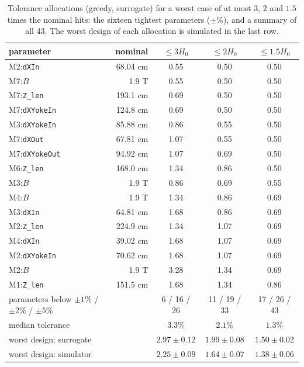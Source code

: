 \documentclass[11pt,a4paper]{article}
\begin{document}
\begin{table}[!htb]
\centering
\caption{Tolerance allocations (greedy, surrogate) for a worst case of at most $3$, $2$ and $1.5$
times the nominal hits: the sixteen tightest parameters ($\pm\%$), and a summary of all 43. The
worst design of each allocation is simulated in the last row.}
\label{tab:allocation}
\small
\begin{tabular}{lrccc}
\toprule
parameter & nominal & $\le3H_0$ & $\le2H_0$ & $\le1.5H_0$ \\
\midrule
M2:\texttt{dXIn}         & 68.04 cm & 0.55 & 0.50 & 0.50 \\
M7:$B$                   & 1.9 T    & 0.55 & 0.50 & 0.50 \\
M7:\texttt{Z\_len}       & 193.1 cm & 0.69 & 0.50 & 0.50 \\
M7:\texttt{dXYokeIn}     & 124.8 cm & 0.69 & 0.50 & 0.50 \\
M3:\texttt{dXYokeIn}     & 85.88 cm & 0.86 & 0.55 & 0.50 \\
M7:\texttt{dXOut}        & 67.81 cm & 1.07 & 0.55 & 0.50 \\
M7:\texttt{dXYokeOut}    & 94.92 cm & 1.07 & 0.69 & 0.50 \\
M6:\texttt{Z\_len}       & 168.0 cm & 1.34 & 0.86 & 0.50 \\
M3:$B$                   & 1.9 T    & 0.86 & 0.69 & 0.55 \\
M4:$B$                   & 1.9 T    & 1.34 & 0.86 & 0.69 \\
M3:\texttt{dXIn}         & 64.81 cm & 1.68 & 0.86 & 0.69 \\
M2:\texttt{Z\_len}       & 224.9 cm & 1.34 & 1.07 & 0.69 \\
M4:\texttt{dXIn}         & 39.02 cm & 1.68 & 1.07 & 0.69 \\
M2:\texttt{dXYokeIn}     & 70.62 cm & 1.68 & 1.07 & 0.69 \\
M2:$B$                   & 1.9 T    & 3.28 & 1.34 & 0.69 \\
M1:\texttt{Z\_len}       & 151.5 cm & 1.68 & 1.34 & 0.86 \\
\midrule
parameters below $\pm1\%$ / $\pm2\%$ / $\pm5\%$ & & 6 / 16 / 26 & 11 / 19 / 33 & 17 / 26 / 43 \\
median tolerance & & $3.3\%$ & $2.1\%$ & $1.3\%$ \\
\midrule
worst design: surrogate & & $2.97\pm0.12$ & $1.99\pm0.08$ & $1.50\pm0.02$ \\
worst design: simulator & & $2.25\pm0.09$ & $1.64\pm0.07$ & $1.38\pm0.06$ \\
\bottomrule
\end{tabular}
\end{table}
\end{document}
